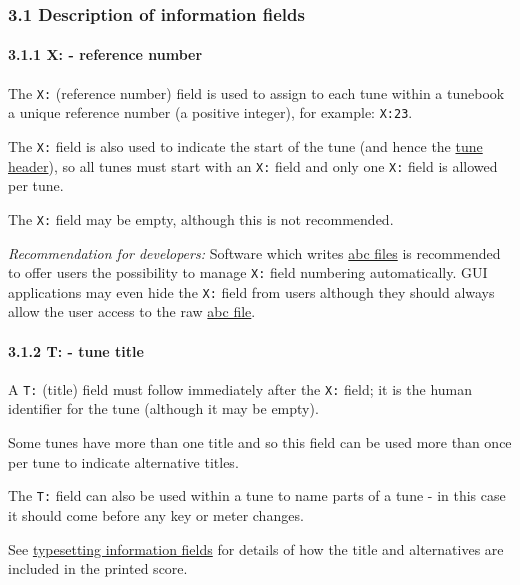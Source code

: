 \documentclass[oneside]{book}
\let\oldparagraph\paragraph
\renewcommand{\paragraph}[1]{\oldparagraph{#1}\mbox{}}
\begin{document}
\hypertarget{description_of_information_fields}{\subsubsection{3.1
Description of information
fields}\label{description_of_information_fields}}

\hypertarget{xreference_number}{\paragraph{3.1.1 X: - reference
number}\label{xreference_number}}

The \texttt{X:} (reference number) field is used to assign to each tune
within a tunebook a unique reference number (a positive integer), for
example: \texttt{X:23}.

The \texttt{X:} field is also used to indicate the start of the tune
(and hence the \protect\hyperlink{tune_header_definition}{tune header}),
so all tunes must start with an \texttt{X:} field and only one
\texttt{X:} field is allowed per tune.

The \texttt{X:} field may be empty, although this is not recommended.

\emph{Recommendation for developers:} Software which writes
\protect\hyperlink{abc_file_definition}{abc files} is recommended to
offer users the possibility to manage \texttt{X:} field numbering
automatically. GUI applications may even hide the \texttt{X:} field from
users although they should always allow the user access to the raw
\protect\hyperlink{abc_file_definition}{abc file}.

\hypertarget{ttune_title}{\paragraph{3.1.2 T: - tune
title}\label{ttune_title}}

A \texttt{T:} (title) field must follow immediately after the
\texttt{X:} field; it is the human identifier for the tune (although it
may be empty).

Some tunes have more than one title and so this field can be used more
than once per tune to indicate alternative titles.

The \texttt{T:} field can also be used within a tune to name parts of a
tune - in this case it should come before any key or meter changes.

See \protect\hyperlink{typesetting_information_fields}{typesetting
information fields} for details of how the title and alternatives are
included in the printed score.
\end{document}
